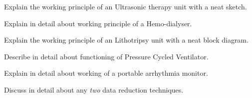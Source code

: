 \item \iitem Explain the working principle of an Ultrasonic therapy unit with a
  neat sketch.
\Or
\item Explain in detail about working principle of a Hemo-dialyser.
\ene

\item \iitem Explain the working principle of an Lithotripsy unit with a neat
  block diagram.
\Or
\item Describe in detail about functioning of Pressure Cycled Ventilator.
\ene

\item \iitem Explain in detail about working of a portable arrhythmia monitor.
\Or
\item Discuss in detail about any \emph{two} data reduction techniques.
\ene

\markC
\ene

